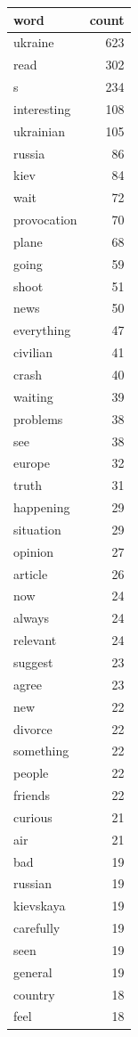 \begin{tabular}{lr}
\toprule
word & count \\
\midrule
ukraine & 623 \\
read & 302 \\
s & 234 \\
interesting & 108 \\
ukrainian & 105 \\
russia & 86 \\
kiev & 84 \\
wait & 72 \\
provocation & 70 \\
plane & 68 \\
going & 59 \\
shoot & 51 \\
news & 50 \\
everything & 47 \\
civilian & 41 \\
crash & 40 \\
waiting & 39 \\
problems & 38 \\
see & 38 \\
europe & 32 \\
truth & 31 \\
happening & 29 \\
situation & 29 \\
opinion & 27 \\
article & 26 \\
now & 24 \\
always & 24 \\
relevant & 24 \\
suggest & 23 \\
agree & 23 \\
new & 22 \\
divorce & 22 \\
something & 22 \\
people & 22 \\
friends & 22 \\
curious & 21 \\
air & 21 \\
bad & 19 \\
russian & 19 \\
kievskaya & 19 \\
carefully & 19 \\
seen & 19 \\
general & 19 \\
country & 18 \\
feel & 18 \\

\end{tabular}

